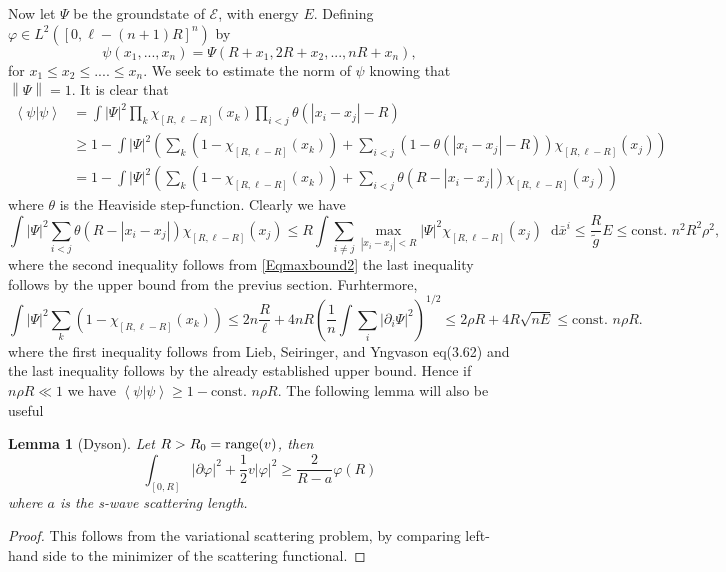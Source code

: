 \documentclass[a4paper,11pt]{article}
\newcommand{\norm}[1]{\left\lVert #1 \right\rVert}
\newcommand{\abs}[1]{\left\lvert #1 \right\rvert}
\renewcommand{\braket}[1]{\left\langle#1\right\rangle}
\newcommand*\diff{\mathop{}\!\mathrm{d}}
\newtheorem{lemma}{Lemma}
\numberwithin{equation}{section}
\begin{document}
	Now let $ \Psi $ be the groundstate of $ \mathcal{E} $, with energy $ E $. Defining $ \varphi\in L^2([0,\ell-(n+1)R]^n) $ by $$ \psi(x_1,...,x_n)=\Psi(R+x_1,2R+x_2,...,nR+x_n), $$
	for $ x_1\leq x_2\leq....\leq x_n $. We seek to estimate the norm of $ \psi $ knowing that $ \norm{\Psi}=1 $. It is clear that \begin{equation}
	\begin{aligned}
	\braket{\psi|\psi}&=\int \abs{\Psi}^2\prod_{k}\chi_{[R,\ell-R]}(x_k) \prod_{i< j}\theta(\abs{x_i-x_j}-R)\\&\geq 1-\int \abs{\Psi}^2\left( \sum_{k}(1-\chi_{[R,\ell-R]}(x_k))+\sum_{i<j}(1-\theta(\abs{x_i-x_j}-R))\chi_{[R,\ell-R]}(x_j)\right)\\
	&=1-\int \abs{\Psi}^2\left( \sum_{k}(1-\chi_{[R,\ell-R]}(x_k))+\sum_{i<j}\theta(R-\abs{x_i-x_j})\chi_{[R,\ell-R]}(x_j)\right)
	\end{aligned}
	\end{equation}
	where $ \theta $ is the Heaviside step-function.
	Clearly we have \begin{equation}
	\int \abs{\Psi}^2\sum_{i<j}\theta(R-\abs{x_i-x_j})\chi_{[R,\ell-R]}(x_j)\leq R\int  \sum_{i\neq j}\max_{\abs{x_i-x_j}<R}\abs{\Psi}^2\chi_{[R,\ell-R]}(x_j)\diff\bar{x}^i\leq \frac{R}{\tilde{g}} E\leq \text{const. }n^2R^2\rho^2,
	\end{equation}
	where the second inequality follows from \eqref{Eqmaxbound2} the last inequality follows by the upper bound from the previus section. Furhtermore, 
	\begin{equation}
	\int \abs{\Psi}^2 \sum_{k}(1-\chi_{[R,\ell-R]}(x_k))\leq 2n\frac{R}{\ell}+4nR\left(\frac1n \int \sum_{i}\abs{\partial_i \Psi}^2\right)^{1/2}\leq 2\rho R + 4R\sqrt{n E}\leq \text{const. }n \rho R.
	\end{equation}
	where the first inequality follows from Lieb, Seiringer, and Yngvason eq(3.62) and the last inequality follows by the already established upper bound. Hence if $ n\rho R\ll 1 $ we have $ \braket{\psi|\psi}\geq 1-\text{const. }n\rho R $.
	The following lemma will also be useful \begin{lemma}[Dyson] Let $ R>R_0=\textnormal{range}(v) $, then
		\begin{equation}
			\int_{[0,R]} \abs{\partial \varphi}^2+\frac12 v\abs{\varphi}^2\geq \frac{2}{R-a}\varphi(R)
		\end{equation}
		where $ a $ is the s-wave scattering length.
	\end{lemma}
	\begin{proof}
		This follows from the variational scattering problem, by comparing left-hand side to the minimizer of the scattering functional.
	\end{proof}
\end{document}
